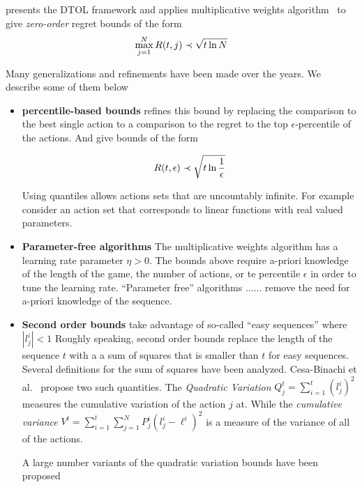 \documentclass{article}[12pt]
\begin{document}
\cite{freund1997decision} presents the DTOL framework and applies
multiplicative weights algorithm~\cite{} to give {\em zero-order}
regret bounds of the form
\begin{equation} \label{eqn:0-order-bound}
  \max_{j=1}^N R(t,j) \prec \sqrt{t \ln N}
\end{equation}

Many generalizations and refinements have been made over the years. We describe some of them below
\begin{itemize}
\item{\bf percentile-based bounds}
\cite{freund1999adaptive} refines this bound by replacing the comparison to the best single action to
a comparison to the regret to the top $\epsilon$-percentile of the actions. And give bounds of the form

\begin{equation} \label{eqn:percentile-bounds}
R(t,\epsilon) \prec \sqrt{t \ln \frac{1}{\epsilon}}
\end{equation}

Using quantiles allows actions sets that are uncountably infinite.
For example consider an action set that corresponds to linear
functions with real valued parameters.

\item{\bf Parameter-free algorithms}
The multiplicative weights algorithm has a learning rate parameter
$\eta>0$. The bounds above require a-priori knowledge of the length of
the game, the number of actions, or te percentile $\epsilon$ in order
to tune the learning rate. ``Parameter free'' algorithms ......
remove the need for a-priori knowledge of the sequence.

\item{\bf Second order bounds} take advantage of so-called ``easy
  sequences'' where $|l_j^i|<1$ Roughly speaking, second order bounds
  replace the length of the sequence $t$ with a a sum of squares that
  is smaller than $t$ for easy sequences.  Several definitions for the
  sum of squares have been analyzed.  Cesa-Binachi et
  al.~\cite{cesa2007improved} propose two such quantities. The {\em
    Quadratic Variation} $Q_j^t=\sum_{i=1}^t (l_j^i)^2$ measures the
  cumulative variation of the action $j$ at. While the {\em cumulative
    variance}
  $V^t = \sum_{i=1}^t \sum_{j=1}^N P^i_j (l_j^i - \ell^i)^2$ is a
  measure of the variance of all of the actions.

  A large number variants of the quadratic variation bounds have been  proposed
  ~\cite{chernov2009prediction,hazan2010extracting,gaillard2014second,koolen2015second}


\end{itemize}
\end{document}
